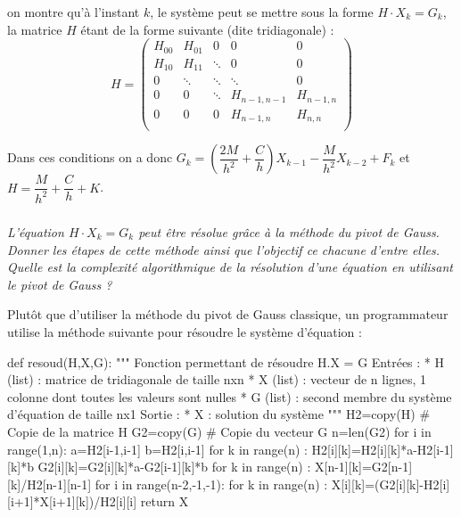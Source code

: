 \documentclass[10pt]{article}
\newif\ifprof
\begin{document}
on montre qu'à l'instant $k$, le système peut se mettre sous la forme $H\cdot X_k = G_k$, la matrice $H$ étant de la forme suivante (dite tridiagonale) :
$$
H =
\begin{pmatrix}
H_{00}  & H_{01} &  0 & 0 & 0 \\
H_{10}  & H_{11} &  \ddots & 0 & 0 \\
0 & \ddots & \ddots & \ddots & 0 \\
0 & 0 & \ddots & H_{n-1,n-1} & H_{n-1,n} \\
0 & 0 & 0 & H_{n-1,n} & H_{n,n} \\
\end{pmatrix}
 $$

\begin{rem}
Dans ces conditions on a donc  $G_k = \left(\dfrac{2M}{h^2}+\dfrac{C}{h} \right)X_{k-1} - \dfrac{M}{h^2} X_{k-2} + F_k $ et $H = \dfrac{M}{h^2} + \dfrac{C}{h} + K$.
\end{rem}

\subparagraph{}
\textit{L'équation  $H\cdot X_k = G_k$ peut être résolue grâce à la méthode du pivot de Gauss. Donner les étapes de cette méthode ainsi que l'objectif ce chacune d'entre elles. Quelle est la complexité algorithmique de la résolution d'une équation en utilisant le pivot de Gauss ?}
\ifprof
\begin{corrige}
\end{corrige}
\else
\fi


Plutôt que d'utiliser la méthode du pivot de Gauss classique, un programmateur utilise la méthode suivante pour résoudre le système d'équation : 
\begin{py}
\begin{python}
def resoud(H,X,G):
    """
    Fonction permettant de résoudre H.X = G
    Entrées : 
        * H (list) : matrice de tridiagonale de taille nxn
        * X (list) : vecteur de n lignes, 1 colonne dont toutes les valeurs sont nulles
        * G (list) : second membre du système d'équation de taille nx1
    Sortie : 
        * X : solution du système
    """
    H2=copy(H)  # Copie de la matrice H
    G2=copy(G)  # Copie du vecteur G
    n=len(G2)
    for i in range(1,n):
        a=H2[i-1,i-1]
        b=H2[i,i-1]
        for k in range(n) :
            H2[i][k]=H2[i][k]*a-H2[i-1][k]*b
            G2[i][k]=G2[i][k]*a-G2[i-1][k]*b
    for k in range(n) :
        X[n-1][k]=G2[n-1][k]/H2[n-1][n-1]
    for i in range(n-2,-1,-1):
        for k in range(n) :
            X[i][k]=(G2[i][k]-H2[i][i+1]*X[i+1][k])/H2[i][i]
    return X

\end{python}
\end{py}
\end{document}
